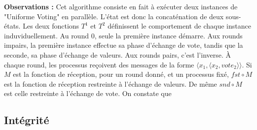 \documentclass{article}
\begin{document}
\textbf{Observations :} Cet algorithme consiste en fait à exécuter deux instances de "Uniforme Voting" en parallèle.
L'état est donc la concaténation de deux sous-états.
Les deux fonctions $T^1$ et $T^2$ définissent le comportement de chaque instance induviduellement.
Au round $0$, seule la première instance démarre.
Aux rounds impairs, la première instance effectue sa phase d'échange de vote, tandis que la seconde, sa phase d'échange de valeurs.
Aux rounds pairs, c'est l'inverse.
À chaque round, les processus reçoivent des messages de la forme $\langle x_1 , \langle x_2, vote_2 \rangle \rangle$.
Si $M$ est la fonction de réception, pour un round donné, et un processus fixé, $fst \circ M$ est la fonction de réception restreinte à l'échange de valeurs.
De même $snd \circ M$ est celle restreinte à l'échange de vote.
On constate que 

\subsection{Intégrité}
\end{document}
